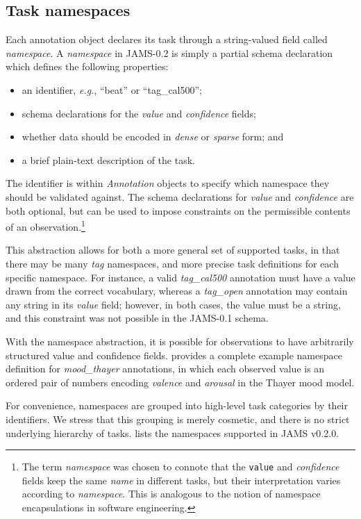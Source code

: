 \documentclass{article}
\begin{document}
\subsection{Task namespaces}\label{sec:schema:namespace}
Each annotation object declares its task through a string-valued field called \emph{namespace}.
A \emph{namespace} in JAMS-0.2 is simply a partial schema declaration which defines the following properties:
\begin{itemize}
    \setlength\itemsep{0em}
    \item an identifier, \emph{e.g.}, ``beat'' or ``tag\_cal500'';
    \item schema declarations for the \emph{value} and \emph{confidence} fields;
    \item whether data should be encoded in \emph{dense} or \emph{sparse} form; and
    \item a brief plain-text description of the task.
\end{itemize}
The identifier is within \emph{Annotation} objects to specify which namespace they should be validated against.
The schema declarations for \emph{value} and \emph{confidence} are both optional, but can be used to impose constraints on the permissible
contents of an observation.\footnote{The term \emph{namespace} was chosen to connote that
the \texttt{value} and \emph{confidence} fields keep the same \emph{name} in different
tasks, but their interpretation varies according to \emph{namespace}.  This is analogous
to the notion of namespace encapsulations in software engineering.}

This abstraction allows for both a more general set of supported tasks, in that there may be many \emph{tag} namespaces, 
and more precise task definitions for each specific namespace.
For instance, a valid \emph{tag\_cal500} annotation must have a value drawn from the correct vocabulary, whereas a \emph{tag\_open}
annotation may contain any string in its \emph{value} field; however, in both cases, the value must be a string, and this constraint was
not possible in the JAMS-0.1 schema.

With the namespace abstraction, it is possible for observations to have arbitrarily structured value and confidence fields.
 provides a complete example namespace definition for \emph{mood\_thayer} annotations, in which each observed value is an ordered pair of numbers encoding \emph{valence}
and \emph{arousal} in the Thayer mood model.

For convenience, namespaces are grouped into high-level task categories by their identifiers.
We stress that this grouping is merely cosmetic, and there is no strict underlying hierarchy of tasks.
 lists the namespaces supported in JAMS v0.2.0.
\end{document}
